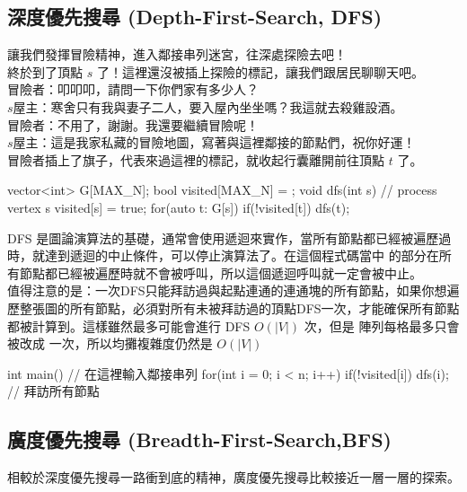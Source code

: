 \documentclass[main.tex]{subfiles}
\begin{document}
\subsection{深度優先搜尋 (Depth-First-Search, DFS)}
讓我們發揮冒險精神，進入鄰接串列迷宮，往深處探險去吧！\\

終於到了頂點 $s$ 了！這裡還沒被插上探險的標記，讓我們跟居民聊聊天吧。\\

冒險者：叩叩叩，請問一下你們家有多少人？\\

$s$屋主：寒舍只有我與妻子二人，要入屋內坐坐嗎？我這就去殺雞設酒。\\

冒險者：不用了，謝謝。我還要繼續冒險呢！\\

$s$屋主：這是我家私藏的冒險地圖，寫著與這裡鄰接的節點們，祝你好運！\\

冒險者插上了旗子，代表來過這裡的標記，就收起行囊離開前往頂點 $t$ 了。\\

\begin{C++}
vector<int> G[MAX_N];
bool visited[MAX_N] = {};
void dfs(int s){
    // process vertex s
    visited[s] = true;
    for(auto t: G[s]){
        if(!visited[t]) dfs(t);
    }
}
\end{C++}

DFS 是圖論演算法的基礎，通常會使用遞迴來實作，當所有節點都已經被遍歷過時，就達到遞迴的中止條件，可以停止演算法了。在這個程式碼當中  的部分在所有節點都已經被遍歷時就不會被呼叫，所以這個遞迴呼叫就一定會被中止。\\

值得注意的是：一次DFS只能拜訪過與起點連通的連通塊的所有節點，如果你想遍歷整張圖的所有節點，必須對所有未被拜訪過的頂點DFS一次，才能確保所有節點都被計算到。這樣雖然最多可能會進行 DFS $O(|V|)$ 次，但是  陣列每格最多只會被改成  一次，所以均攤複雜度仍然是 $O(|V|)$

\begin{C++}
int main(){
    // 在這裡輸入鄰接串列
    for(int i = 0; i < n; i++){
        if(!visited[i]) dfs(i); // 拜訪所有節點
    }
}
\end{C++}


\subsection{廣度優先搜尋 (Breadth-First-Search,BFS)}
相較於深度優先搜尋一路衝到底的精神，廣度優先搜尋比較接近一層一層的探索。\\
\end{document}
